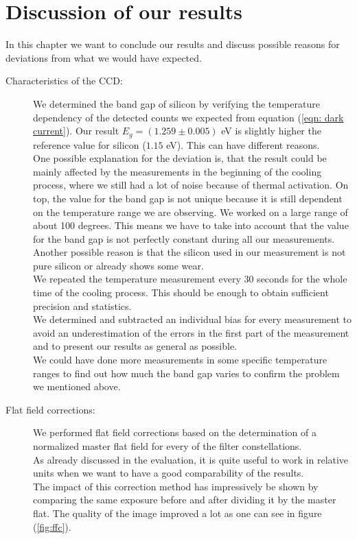 \chapter{Discussion of our results}
In this chapter we want to conclude our results and discuss possible reasons for deviations from what we would have expected. \\
\begin{description}
	\item[Characteristics of the CCD:] We determined the band gap of silicon by verifying the temperature dependency of the detected counts we expected from equation (\ref{eqn: dark current}). Our result $E_g = (1.259 \pm 0.005)$ eV is slightly higher the reference value for silicon ($1.15$ eV). This can have different reasons. \\ One possible explanation for the deviation is, that the  result could be mainly affected by the  measurements in the beginning  of the cooling process, where we still had a lot of noise because of thermal activation. On top, the value for the band gap is not unique because it is still dependent on the temperature range we are observing. We worked on a large range of about 100 degrees. This means we have to take into account that the value for the band gap is not perfectly constant during all our measurements. \\ Another possible reason is that the silicon  used in our measurement is not pure silicon or  already shows some wear. \\ We repeated the temperature measurement every 30 seconds for the whole time of the cooling process. This should be enough to obtain sufficient precision and statistics. \\
		We determined and subtracted an individual bias for every measurement to avoid an underestimation of the errors in the first part of the measurement and to present our results as general as possible. \\
		 We could have done more measurements in some specific temperature ranges to find out how much the band gap varies to confirm the problem we mentioned above. 
	\item[Flat field corrections:] We performed flat field corrections based on the determination of a normalized master flat field for every of the filter constellations. \\ As already discussed in the evaluation, it is quite useful to work in relative units when we want to have a good comparability of the results.\\ The impact of this correction method has impressively be shown by comparing the same exposure before and after dividing it by the master flat. The quality of the image improved a lot as one can see in figure (\ref{fig:ffc}). \\

\end{description}
